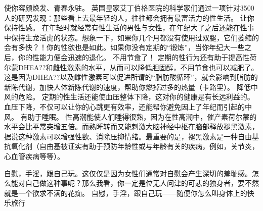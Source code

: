\documentclass[12pt,UTF8,openany]{ctexbook}
\begin{document}
使你容颜焕发、青春永驻。
英国皇家艾丁伯格医院的科学家们通过一项针对3500人的研究发现：那些看上去最年轻的人，往往都会拥有最富活力的性生活。
让你保持性感。
在年轻时就经常有性生活的男性与女性，在年纪大了之后还能在性事中保持生龙活虎的状态。想象一下，如果你几个月都没有使用过双腿，它们萎缩的会有多快？！你的性欲也是如此。如果你没有定期的“锻炼”，当你年纪大一些之后，你的性能力便会迅速的退化。
不用节食了！
定期的性行为还有助于提高性荷尔蒙DHEA??和雌性激素的水平，从而可以降低胆固醇，不用节食也可以减肥了。这是因为DHEA??以及雌性激素可以促进所谓的“脂肪酸循环”，就会影响到脂肪的新陈代谢，加快人体新陈代谢的速度，帮助你燃掉过多的热量（卡路里）。
降低中风的危险。
定期的性生活还能使血压整体下降，这对你的健康是有长远利益的。血压下降，不仅可以让你的心跳更有效率，还能帮你避免因上了年纪而引起的中风。
有助于睡眠。
性高潮能使人们睡得很熟，因为在性高潮中，催产素荷尔蒙的水平会比平常突增五倍。而熟睡转而又能刺激大脑神经中枢在脑部释放褪黑激素，据说这种激素可以增强性欲、消除压抑情绪。最重要的是，褪黑激素是一种自由基抗氧化剂（自由基被证实有助于预防年龄性或与年龄有关的疾病，例如，关节炎，心血管疾病等等）。

自慰，手淫，跟自己玩。这仅仅是因为女性们通常对自慰会产生深切的羞耻感。怎么能对自己做这种事呢？那么我看，你一定是位无人问津的可悲的独身者，要不然就是一个欲求不满的花痴。
自慰，手淫，跟自己玩——随便你怎么叫身体上的快乐旅行
\end{document}
